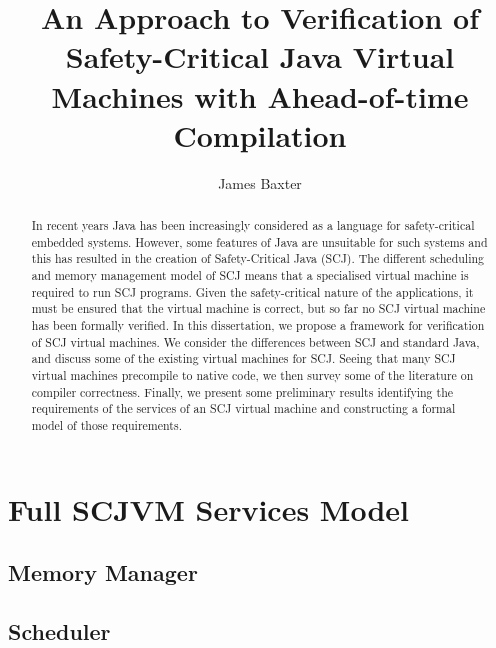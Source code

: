 \documentclass[a4paper,10pt]{report}
\title{An Approach to Verification of Safety-Critical Java Virtual
  Machines with Ahead-of-time Compilation}
\author{James Baxter}
\date{}
\newif\ifFullModel
\theoremstyle{definition}
\begin{document}
\maketitle

\begin{abstract}
  In recent years Java has been increasingly considered as a language
  for safety-critical embedded systems.
  However, some features of Java are unsuitable for such systems and
  this has resulted in the creation of Safety-Critical Java (SCJ).
  The different scheduling and memory management model of SCJ means
  that a specialised virtual machine is required to run SCJ programs.
  Given the safety-critical nature of the applications, it must be
  ensured that the virtual machine is correct, but so far no SCJ
  virtual machine has been formally verified.
  In this dissertation, we propose a framework for verification of SCJ
  virtual machines.
  We consider the differences between SCJ and standard Java, and
  discuss some of the existing virtual machines for SCJ.
  Seeing that many SCJ virtual machines precompile to native code, we
  then survey some of the literature on compiler correctness.
  Finally, we present some preliminary results identifying the
  requirements of the services of an SCJ virtual machine and
  constructing a formal model of those requirements.
\end{abstract}

\tableofcontents













{\raggedright \printbibliography}

\appendix

\chapter{Full SCJVM Services Model}
\label{full-scjvm-services-model}
\FullModeltrue

\section{Memory Manager}


\section{Scheduler}

\end{document}
